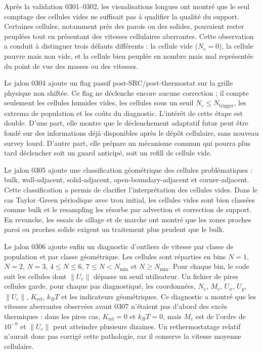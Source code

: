 \documentclass[11pt,a4paper]{article}
\begin{document}
Après la validation 0301--0302, les visualisations longues ont montré que le seul comptage des cellules vides ne suffisait pas à qualifier la qualité du support. Certaines cellules, notamment près des parois ou des solides, pouvaient rester peuplées tout en présentant des vitesses cellulaires aberrantes. Cette observation a conduit à distinguer trois défauts différents : la cellule vide ($N_c=0$), la cellule pauvre mais non vide, et la cellule bien peuplée en nombre mais mal représentée du point de vue des masses ou des vitesses.

Le jalon 0304 ajoute un flag passif post-SRC/post-thermostat sur la grille physique non shiftée. Ce flag ne déclenche encore aucune correction ; il compte seulement les cellules humides vides, les cellules sous un seuil $N_c\leq N_{\mathrm{trigger}}$, les extrema de population et les coûts du diagnostic. L'intérêt de cette étape est double. D'une part, elle montre que le déclenchement adaptatif futur peut être fondé sur des informations déjà disponibles après le dépôt cellulaire, sans nouveau survey lourd. D'autre part, elle prépare un mécanisme commun qui pourra plus tard déclencher soit un guard anticipé, soit un refill de cellule vide.

Le jalon 0305 ajoute une classification géométrique des cellules problématiques : bulk, wall-adjacent, solid-adjacent, open-boundary-adjacent et corner-adjacent. Cette classification a permis de clarifier l'interprétation des cellules vides. Dans le cas Taylor--Green périodique avec trou initial, les cellules vides sont bien classées comme bulk et le resampling les résorbe par advection et correction de support. En revanche, les essais de sillage et de marche ont montré que les zones proches paroi ou proches solide exigent un traitement plus prudent que le bulk.

Le jalon 0306 ajoute enfin un diagnostic d'outliers de vitesse par classe de population et par classe géométrique. Les cellules sont réparties en bins $N=1$, $N=2$, $N=3$, $4\leq N\leq 6$, $7\leq N<N_{\min}$ et $N\geq N_{\min}$. Pour chaque bin, le code suit les cellules dont $\lVert U_c\rVert$ dépasse un seuil utilisateur. Un fichier de pires cellules garde, pour chaque pas diagnostiqué, les coordonnées, $N_c$, $M_c$, $U_x$, $U_y$, $\lVert U_c\rVert$, $K_{\mathrm{rel}}$, $k_BT$ et les indicateurs géométriques. Ce diagnostic a montré que les vitesses aberrantes observées avant 0307 n'étaient pas d'abord des excès thermiques : dans les pires cas, $K_{\mathrm{rel}}=0$ et $k_BT=0$, mais $M_c$ est de l'ordre de $10^{-9}$ et $\lVert U_c\rVert$ peut atteindre plusieurs dizaines. Un rethermostatage relatif n'aurait donc pas corrigé cette pathologie, car il conserve la vitesse moyenne cellulaire.
\end{document}
